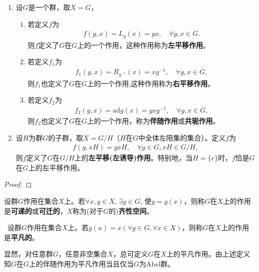 \documentclass[../../main.tex]{subfiles}%
\begin{document}
\begin{theorem}\label{theorem:一些常见的群作用的良定义性}
\begin{enumerate}
\item 设$G$是一个群，取$X = G$，
\begin{enumerate}
\item 若定义$f$为
\begin{align*}
f(g, x) = L_g(x) = gx, \quad \forall g, x \in G.
\end{align*}
则$f$定义了$G$在$G$上的一个作用，这种作用称为\textbf{左平移作用}。

\item 若定义$f_1$为
\begin{align*}
f_1(g, x) = R_{g^{-1}}(x) = xg^{-1}, \quad \forall g, x \in G,
\end{align*}
则$f_1$也定义了$G$在$G$上的一个作用,这种作用称为\textbf{右平移作用}。

\item 若定义$f_2$为
\begin{align*}
f_2(g, x) = \text{ad}g(x) = gxg^{-1}, \quad \forall g, x \in G,
\end{align*}
则$f_2$也定义了$G$在$G$上的一个作用，称为\textbf{伴随作用}或\textbf{共轭作用}。
\end{enumerate}

\item 设$H$为群$G$的子群，取$X = G/H$（$H$在$G$中全体左陪集的集合）。定义$f$为
\begin{align*}
f(g, xH) = gxH, \quad \forall g \in G, xH \in G/H,
\end{align*}
则$f$定义了$G$在$G/H$上的\textbf{左平移(左诱导)作用}。特别地，当$H = \{e\}$时，$f$恰是$G$在$G$上的左平移作用。
\end{enumerate}

\end{theorem}
\begin{proof}

\end{proof}

\begin{definition}
设群$G$作用在集合$X$上。若$\forall x, y \in X$, $\exists g \in G$, 使$y = g(x)$，则称$G$在$X$上的作用是\textbf{可递的}或\textbf{可迁的}，$X$称为(对于$G$的)\textbf{齐性空间}。
\end{definition}

\begin{definition}\
设群$G$作用在集合$X$上。若$g(x) = x(\forall g \in G, \forall x \in X)$，则称$G$在$X$上的作用是\textbf{平凡的}。
\end{definition}
\begin{remark}
显然，对任意群$G$，任意非空集合$X$，总可定义$G$在$X$上的平凡作用。由上述定义知$G$在$G$上的伴随作用为平凡作用当且仅当$G$为Abel群。

\end{remark}
\end{document}
